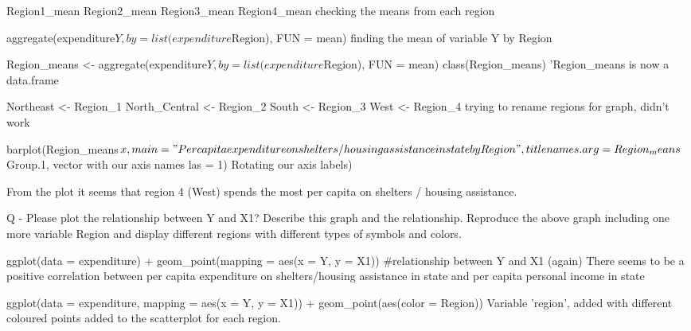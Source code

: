 \documentclass[12pt,letterpaper]{article}
\begin{document}
Region1_mean
Region2_mean
Region3_mean
Region4_mean checking the means from each region

aggregate(expenditure$Y, by = list(expenditure$Region), FUN = mean) finding the mean of variable Y by Region

Region_means <- aggregate(expenditure$Y, by = list(expenditure$Region), FUN = mean)
class(Region_means)  'Region_means is now a data.frame

Northeast <- Region_1
North_Central <- Region_2
South <- Region_3
West <- Region_4  trying to rename regions for graph, didn't work

barplot(Region_means$x,
main = "Per capita expenditure on shelters/housing assistance in state by Region", title
names.arg = Region_means$Group.1, vector with our axis names
las = 1) Rotating our axis labels)

From the plot it seems that region 4 (West) spends the most per capita on shelters / housing assistance.

Q - Please plot the relationship between Y and X1? Describe this graph and the relationship. Reproduce the above graph including one more variable Region and display diﬀerent regions with diﬀerent types of symbols and colors.

ggplot(data = expenditure) + geom_point(mapping = aes(x = Y, y = X1)) #relationship between Y and X1 (again)
There seems to be a positive correlation between per capita expenditure on shelters/housing assistance in state and per capita personal income in state

ggplot(data = expenditure, mapping = aes(x = Y, y = X1)) + geom_point(aes(color = Region))
Variable 'region', added with different coloured points added to the scatterplot for each region.
\end{document}
